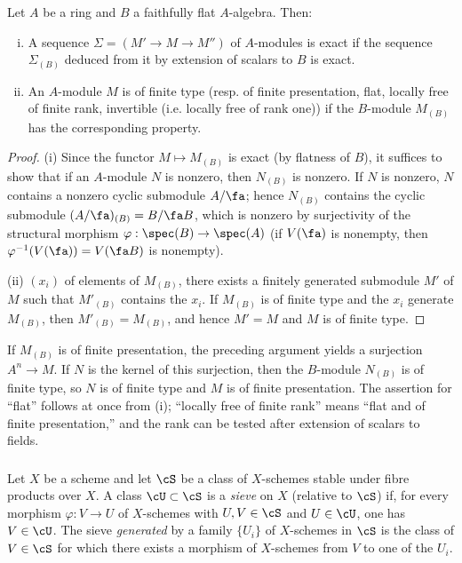 \begin{proposition}\label{I:1-4-2}
Let $A$ be a ring and $B$ a faithfully flat $A$-algebra. Then:
\begin{enumerate}[(i)]
  \item A sequence $\Sigma=(M'\to M\to M'')$ of $A$-modules is exact if
    the sequence $\Sigma_{(B)}$ deduced from it by extension of scalars to
    $B$ is exact.
  \item An $A$-module $M$ is of finite type (resp. of finite presentation,
    flat, locally free of finite rank, invertible (i.e. locally free of rank
    one)) if the $B$-module $M_{(B)}$ has the corresponding property.
\end{enumerate}
\end{proposition}
\begin{proof}
(i) Since the functor $M\mapsto M_{(B)}$ is exact (by flatness of $B$),
it suffices to show that if an $A$-module $N$ is nonzero, then
$N_{(B)}$ is nonzero. If $N$ is nonzero, $N$ contains a nonzero cyclic
submodule $A/\fa$; hence $N_{(B)}$ contains the cyclic submodule
$(A/\fa)_{(B)}=B/\fa B$, which is nonzero by surjectivity of the
structural morphism $\varphi:\spec(B)\to\spec(A)$ (if $V(\fa)$ is
nonempty, then $\varphi^{-1}(V(\fa))=V(\fa B)$ is nonempty).

(ii)  $(x_i)$ of elements of $M_{(B)}$, there exists a
finitely generated submodule $M'$ of $M$ such that $M'_{(B)}$ contains
the $x_i$. If $M_{(B)}$ is of finite type and the $x_i$ generate
$M_{(B)}$, then $M'_{(B)}=M_{(B)}$, and hence $M'=M$ and $M$ is of
finite type.
\end{proof}

If $M_{(B)}$ is of finite presentation, the preceding argument yields a
surjection $A^n\to M$. If $N$ is the kernel of this surjection, then the
$B$-module $N_{(B)}$ is of finite type, so $N$ is of finite type and
$M$ is of finite presentation. The assertion for “flat” follows at once
from (i); “locally free of finite rank” means “flat and of finite
presentation,” and the rank can be tested after extension of scalars to
fields.

\subsubsection{}\label{I:1-4-3}

Let $X$ be a scheme and let $\cS$ be a class of $X$-schemes stable under
fibre products over $X$. A class $\cU\subset\cS$ is a \emph{sieve} on
$X$ (relative to $\cS$) if, for every morphism $\varphi:V\to U$ of
$X$-schemes with $U,V\in\cS$ and $U\in\cU$, one has $V\in\cU$.
The sieve \emph{generated} by a family $\{U_i\}$ of $X$-schemes in
$\cS$ is the class of $V\in\cS$ for which there exists a morphism of
$X$-schemes from $V$ to one of the $U_i$.

